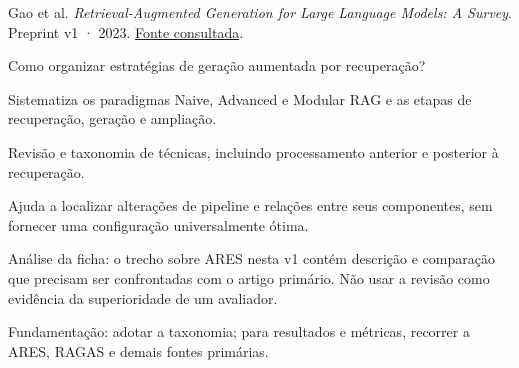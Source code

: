 {\small Gao et al. \textit{Retrieval-Augmented Generation for Large Language Models: A Survey}. Preprint v1 · 2023. \href{https://arxiv.org/pdf/2312.10997v1}{Fonte consultada}.\par}

Como organizar estratégias de geração aumentada por recuperação?

Sistematiza os paradigmas Naive, Advanced e Modular RAG e as etapas de recuperação, geração e ampliação.

Revisão e taxonomia de técnicas, incluindo processamento anterior e posterior à recuperação.

Ajuda a localizar alterações de pipeline e relações entre seus componentes, sem fornecer uma configuração universalmente ótima.

\begin{itemize}
\end{itemize}

Análise da ficha: o trecho sobre ARES nesta v1 contém descrição e comparação que precisam ser confrontadas com o artigo primário. Não usar a revisão como evidência da superioridade de um avaliador.

Fundamentação: adotar a taxonomia; para resultados e métricas, recorrer a ARES, RAGAS e demais fontes primárias.

